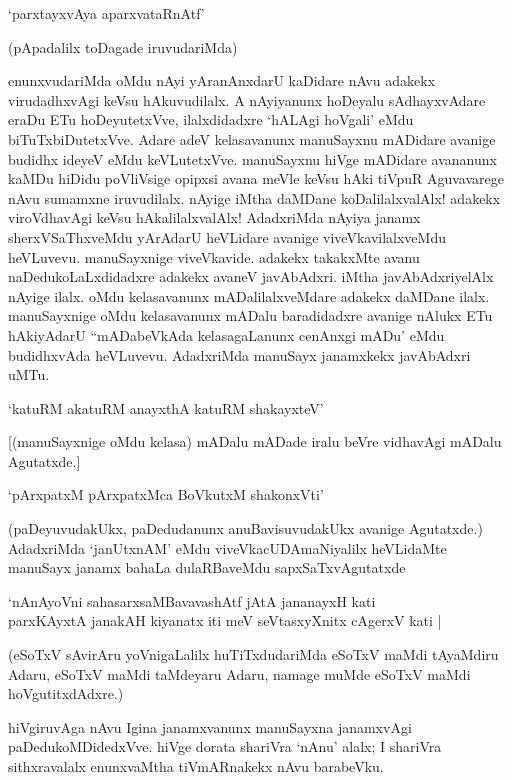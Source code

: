 \begin{shloka}
`parxtayxvAya aparxvataRnAtf'
\end{shloka}

(pApadalilx toDagade iruvudariMda)

enunxvudariMda oMdu nAyi yAranAnxdarU kaDidare nAvu adakekx virudadhxvAgi keVsu hAkuvudilalx. A nAyiyanunx hoDeyalu sAdhayxvAdare eraDu ETu hoDeyutetxVve, ilalxdidadxre `hALAgi hoVgali' eMdu biTuTxbiDutetxVve. Adare adeV kelasavanunx manuSayxnu mADidare avanige budidhx ideyeV eMdu keVLutetxVve. manuSayxnu hiVge mADidare avananunx kaMDu hiDidu poVliVsige opipxsi avana meVle keVsu hAki tiVpuR Aguvavarege nAvu sumamxne iruvudilalx. nAyige iMtha daMDane koDalilalxvalAlx! adakekx viroVdhavAgi keVsu hAkalilalxvalAlx! AdadxriMda nAyiya janamx sherxVSaThxveMdu yArAdarU heVLidare avanige viveVkavilalxveMdu heVLuvevu. manuSayxnige viveVkavide. adakekx takakxMte avanu naDedukoLaLxdidadxre adakekx avaneV javAbAdxri. iMtha javAbAdxriyelAlx nAyige ilalx. oMdu kelasavanunx mADalilalxveMdare adakekx daMDane ilalx. manuSayxnige oMdu kelasavanunx mADalu baradidadxre avanige nAlukx ETu hAkiyAdarU ``mADabeVkAda kelasagaLanunx cenAnxgi mADu' eMdu budidhxvAda heVLuvevu. AdadxriMda manuSayx janamxkekx javAbAdxri uMTu.

\begin{shloka}
`katuRM akatuRM anayxthA katuRM shakayxteV'
\end{shloka}

[(manuSayxnige oMdu kelasa) mADalu mADade iralu beVre vidhavAgi mADalu Agutatxde.]

\begin{shloka}
`pArxpatxM pArxpatxMca BoVkutxM shakonxVti'
\end{shloka}

(paDeyuvudakUkx, paDedudanunx anuBavisuvudakUkx avanige Agutatxde.) AdadxriMda `janUtxnAM' eMdu viveVkacUDAmaNiyalilx heVLidaMte manuSayx janamx bahaLa dulaRBaveMdu sapxSaTxvAgutatxde

\begin{shloka}
`nAnAyoVni sahasarxsaMBavavashAtf jAtA jananayxH kati\\
parxKAyxtA janakAH kiyanatx iti meV seVtasxyXnitx cAgerxV kati |
\end{shloka}

(eSoTxV sAvirAru yoVnigaLalilx huTiTxdudariMda eSoTxV maMdi tAyaMdiru Adaru, eSoTxV maMdi taMdeyaru Adaru, namage muMde eSoTxV maMdi hoVgutitxdAdxre.)

hiVgiruvAga nAvu Igina janamxvanunx manuSayxna janamxvAgi paDedukoMDidedxVve. hiVge dorata shariVra `nAnu' alalx; I shariVra sithxravalalx enunxvaMtha tiVmARnakekx nAvu barabeVku.

